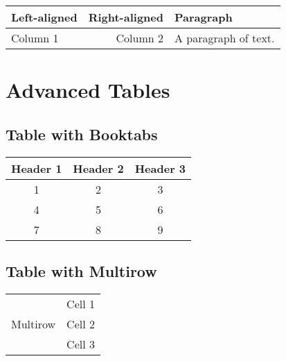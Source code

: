 \documentclass{article}
\begin{document}
\begin{tabular}{|l|r|p{3cm}|}
\hline
Left-aligned & Right-aligned & Paragraph \\
\hline
Column 1 & Column 2 & A paragraph of text. \\
\hline
\end{tabular}

\section{Advanced Tables}

\subsection{Table with Booktabs}

\begin{tabular}{ccc}
\toprule
Header 1 & Header 2 & Header 3 \\
\midrule
1 & 2 & 3 \\
4 & 5 & 6 \\
7 & 8 & 9 \\
\bottomrule
\end{tabular}

\subsection{Table with Multirow}

\begin{tabular}{cc}
\hline
\multirow{3}{*}{Multirow} & Cell 1 \\
& Cell 2 \\
& Cell 3\\
\hline
\end{tabular}
\end{document}
